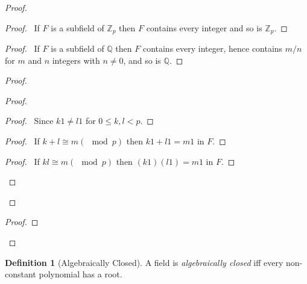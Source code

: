 \documentclass{article}
\let\qed\relax
\theoremstyle{definition}
\newtheorem{definition}[axiom]{Definition}
\begin{document}
    \begin{proof}
        \pf
        \begin{proof}
            \pf\ If $F$ is a subfield of $\mathbb{Z}_p$ then $F$ contains every integer and so is $\mathbb{Z}_p$.
        \end{proof}
        \begin{proof}
            \pf\ If $F$ is a subfield of $\mathbb{Q}$ then $F$ contains every integer, hence contains $m/n$ for
            $m$ and $n$ integers with $n \neq 0$, and so is $\mathbb{Q}$.
        \end{proof}
        \begin{proof}
            \begin{proof}
                \begin{proof}
                    \pf\ Since $k1 \neq l1$ for $0 \leq k,l < p$.
                \end{proof}
                \begin{proof}
                    \pf\ If $k + l \cong m (\mod p)$ then $k1 + l1 = m1$ in $F$.
                \end{proof}
                \begin{proof}
                    \pf\ If $kl \cong m (\mod p)$ then $(k1)(l1) = m1$ in $F$.
                \end{proof}
            \end{proof}
        \end{proof}
        \begin{proof}
        \end{proof}
        \qed
    \end{proof}

    \begin{definition}[Algebraically Closed]
        A field is \emph{algebraically closed} iff every non-constant polynomial has a root.
    \end{definition}
\end{document}
